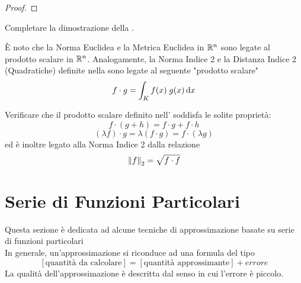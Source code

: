 \begin{proposition}
\begin{proof}
	\end{proof}
\end{proposition}
\begin{exercise}
	Completare la dimostrazione della .
\end{exercise}
\begin{observation}
	\label{obs:prod_scal_dist_quadr}
	È noto che la Norma Euclidea e la Metrica Euclidea in $\mathbb{R}^n$ sono legate al prodotto scalare in $\mathbb{R}^n$. Analogamente, la Norma Indice 2 e la Distanza Indice 2 (Quadratiche) definite nella  sono legate al seguente "prodotto scalare"
	\[f \cdot g = \int_{K} f(x) \; g(x) \,\mathrm{d}{x}\]
\end{observation}
\begin{exercise}
	Verificare che il prodotto scalare definito nell' soddisfa le solite proprietà:
	\[f \cdot (g + h) = f \cdot g + f \cdot h\]
	\[(\lambda f) \cdot g = \lambda (f \cdot g) = f \cdot (\lambda g)\]
	ed è inoltre legato alla Norma Indice 2 dalla relazione
	\[\left\|f\right\|_2 = \sqrt{f \cdot f}\]
\end{exercise}

\newpage
\section{Serie di Funzioni Particolari}\label{sect:ser_funz_particol}
Questa sezione è dedicata ad alcune tecniche di approssimazione  basate su serie di funzioni particolari\\
In generale, un'approssimazione si riconduce ad una formula del tipo
\[\left[\text{quantità da calcolare}\right]=\left[\text{quantità approssimante}\right]+ errore\]
La qualità dell'approssimazione è descritta dal senso in cui l'errore è piccolo.
